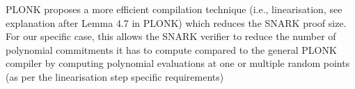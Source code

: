 \noindent PLONK proposes a more efficient compilation technique (i.e., linearisation, see explanation after Lemma 4.7 in PLONK) 
which reduces the SNARK proof size. 
For our specific case, this allows the SNARK verifier to reduce the 
number of polynomial commitments it has to compute compared to the general PLONK compiler by computing 
polynomial evaluations at one or multiple random points (as per the linearisation step specific requirements) 
